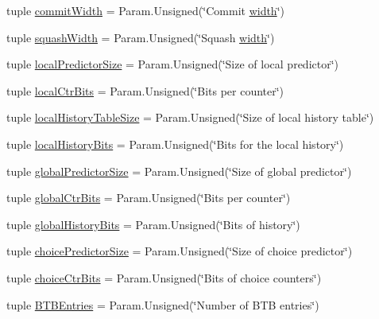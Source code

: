 \begin{DoxyCompactItemize}
\item 
tuple \hyperlink{classSimpleOzoneCPU_1_1SimpleOzoneCPU_a3df421018d58bcd7f02c3965f6b43ac3}{commitWidth} = Param.Unsigned(\char`\"{}Commit \hyperlink{classSimpleOzoneCPU_1_1SimpleOzoneCPU_a397bb3beea7b21f074bc75e1e71f132f}{width}\char`\"{})
\item 
tuple \hyperlink{classSimpleOzoneCPU_1_1SimpleOzoneCPU_a822a947e7bb7034547d91ec80d337303}{squashWidth} = Param.Unsigned(\char`\"{}Squash \hyperlink{classSimpleOzoneCPU_1_1SimpleOzoneCPU_a397bb3beea7b21f074bc75e1e71f132f}{width}\char`\"{})
\item 
tuple \hyperlink{classSimpleOzoneCPU_1_1SimpleOzoneCPU_ac2af65faa5d32c894af40e4477fbfe65}{localPredictorSize} = Param.Unsigned(\char`\"{}Size of local predictor\char`\"{})
\item 
tuple \hyperlink{classSimpleOzoneCPU_1_1SimpleOzoneCPU_a2da1de2b433849a9666f13cf821c1539}{localCtrBits} = Param.Unsigned(\char`\"{}Bits per counter\char`\"{})
\item 
tuple \hyperlink{classSimpleOzoneCPU_1_1SimpleOzoneCPU_a711db16eca8627517aca59fb2aa5565b}{localHistoryTableSize} = Param.Unsigned(\char`\"{}Size of local history table\char`\"{})
\item 
tuple \hyperlink{classSimpleOzoneCPU_1_1SimpleOzoneCPU_abc8222dc26502ccba1f3eadbb2663bc0}{localHistoryBits} = Param.Unsigned(\char`\"{}Bits for the local history\char`\"{})
\item 
tuple \hyperlink{classSimpleOzoneCPU_1_1SimpleOzoneCPU_ae96feffd947249a9c9cd50de8d89ef9e}{globalPredictorSize} = Param.Unsigned(\char`\"{}Size of global predictor\char`\"{})
\item 
tuple \hyperlink{classSimpleOzoneCPU_1_1SimpleOzoneCPU_a94aef0cf23359796beb413a3078186ef}{globalCtrBits} = Param.Unsigned(\char`\"{}Bits per counter\char`\"{})
\item 
tuple \hyperlink{classSimpleOzoneCPU_1_1SimpleOzoneCPU_af5dcca0868471669d21af0002ce7abd7}{globalHistoryBits} = Param.Unsigned(\char`\"{}Bits of history\char`\"{})
\item 
tuple \hyperlink{classSimpleOzoneCPU_1_1SimpleOzoneCPU_acd59ddeaa888aee8a086f93d0ce0afbc}{choicePredictorSize} = Param.Unsigned(\char`\"{}Size of choice predictor\char`\"{})
\item 
tuple \hyperlink{classSimpleOzoneCPU_1_1SimpleOzoneCPU_ae5455b064804378b4ec6f8094452896d}{choiceCtrBits} = Param.Unsigned(\char`\"{}Bits of choice counters\char`\"{})
\item 
tuple \hyperlink{classSimpleOzoneCPU_1_1SimpleOzoneCPU_af08b7bde310be401d556775d6f7022c8}{BTBEntries} = Param.Unsigned(\char`\"{}Number of BTB entries\char`\"{})

\end{DoxyCompactItemize}
